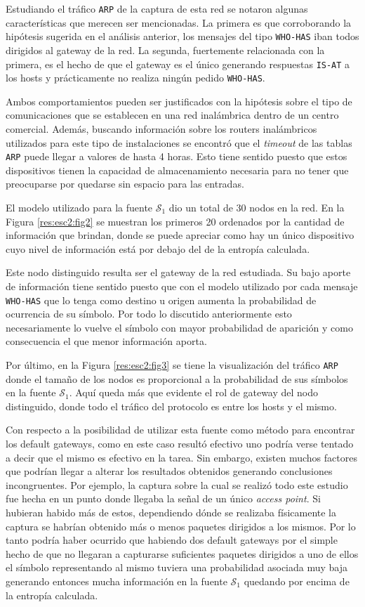 Estudiando el tráfico \texttt{ARP} de la captura de esta red se notaron algunas
características que merecen ser mencionadas. La primera es que corroborando la
hipótesis sugerida en el análisis anterior, los mensajes del tipo
\texttt{WHO-HAS} iban todos dirigidos al gateway de la red. La segunda,
fuertemente relacionada con la primera, es el hecho de que el gateway es el
único generando respuestas \texttt{IS-AT} a los hosts y prácticamente no realiza
ningún pedido \texttt{WHO-HAS}.

Ambos comportamientos pueden ser justificados con la hipótesis sobre el tipo de
comunicaciones que se establecen en una red inalámbrica dentro de un centro
comercial. Además, buscando información sobre los routers inalámbricos
utilizados para este tipo de instalaciones se encontró que el \emph{timeout} de
las tablas \texttt{ARP} puede llegar a valores de hasta 4 horas. Esto tiene
sentido puesto que estos dispositivos tienen la capacidad de almacenamiento
necesaria para no tener que preocuparse por quedarse sin espacio para las
entradas.

El modelo utilizado para la fuente $\mathcal{S}_1$ dio un total de 30 nodos en la
red. En la Figura \ref{res:esc2:fig2} se muestran los primeros 20 ordenados por
la cantidad de información que brindan, donde se puede apreciar como hay un
único dispositivo cuyo nivel de información está por debajo del de la entropía
calculada.

Este nodo distinguido resulta ser el gateway de la red estudiada. Su bajo aporte
de información tiene sentido puesto que con el modelo utilizado por cada mensaje
\texttt{WHO-HAS} que lo tenga como destino u origen aumenta la probabilidad de
ocurrencia de su símbolo. Por todo lo discutido anteriormente esto
necesariamente lo vuelve el símbolo con mayor probabilidad de aparición y como
consecuencia el que menor información aporta.

Por último, en la Figura \ref{res:esc2:fig3} se tiene la visualización del
tráfico \texttt{ARP} donde el tamaño de los nodos es proporcional a la
probabilidad de sus símbolos en la fuente $\mathcal{S}_1$. Aquí queda más que
evidente el rol de gateway del nodo distinguido, donde todo el tráfico del
protocolo es entre los hosts y el mismo.

Con respecto a la posibilidad de utilizar esta fuente como método para encontrar
los default gateways, como en este caso resultó efectivo uno podría verse
tentado a decir que el mismo es efectivo en la tarea. Sin embargo, existen muchos
factores que podrían llegar a alterar los resultados obtenidos generando
conclusiones incongruentes. Por ejemplo, la captura sobre la cual se realizó
todo este estudio fue hecha en un punto donde llegaba la señal de un único
\emph{access point}. Si hubieran habido más de estos, dependiendo dónde se
realizaba físicamente la captura se habrían obtenido más o menos paquetes
dirigidos a los mismos. Por lo tanto podría haber ocurrido que habiendo dos
default gateways por el simple hecho de que no llegaran a capturarse suficientes
paquetes dirigidos a uno de ellos el símbolo representando al mismo tuviera una
probabilidad asociada muy baja generando entonces mucha información en la fuente
$\mathcal{S}_1$ quedando por encima de la entropía calculada.

